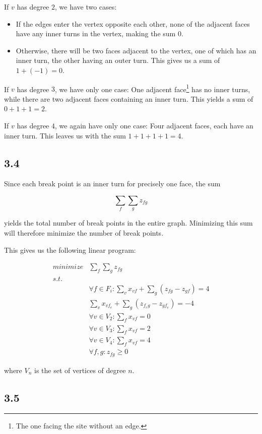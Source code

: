 \documentclass[11pt,a4paper]{article}
\begin{document}
If $v$ has degree $2$, we have two cases:

\begin{itemize}
    \item If the edges enter the vertex opposite each other, none of the
          adjacent faces have any inner turns in the vertex, making the sum $0$.
    \item Otherwise, there will be two faces adjacent to the vertex, one of
          which has an inner turn, the other having an outer turn. This gives us a
          sum of $1 + (-1) = 0$.
\end{itemize}

If $v$ has degree $3$, we have only one case: One adjacent face\footnote{The
one facing the site without an edge.} has no inner turns, while there are two
adjacent faces containing an inner turn. This yields a sum of $0+1+1 = 2$.

If $v$ has degree $4$, we again have only one case: Four adjacent faces, each
have an inner turn. This leaves us with the sum $1+1+1+1=4$.

\subsection{3.4}
Since each break point is an inner turn for precisely one face, the sum

\[
    \sum_f \sum_g z_{fg}
\]

yields the total number of break points in the entire graph. Minimizing this
sum will therefore minimize the number of break points.

This gives us the following linear program:

\begin{align*}
    minimize & \sum_f \sum_g z_{fg} \\
    s.t.     & \\
             & \forall f \in F_i: \sum_v x_{vf} + \sum_g (z_{fg} - z_{gf}) = 4 \\
             & \sum_v x_{vf_e} + \sum_g (z_{f_eg} - z_{gf_e}) = -4 \\
             & \forall v \in V_2: \sum_f x_{vf} = 0 \\
             & \forall v \in V_3: \sum_f x_{vf} = 2 \\
             & \forall v \in V_4: \sum_f x_{vf} = 4 \\
             & \forall f, g: z_{fg} \geq 0 
\end{align*}

where $V_n$ is the set of vertices of degree $n$.

\subsection{3.5}



\end{document}

